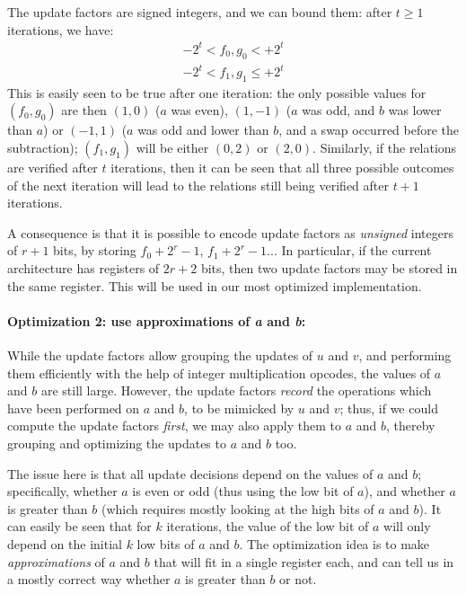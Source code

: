 \documentclass{llncs}
\begin{document}
The update factors are signed integers, and we can bound them: after
$t \geq 1$ iterations, we have:
\begin{equation*}
    \begin{gathered}
    -2^t < f_0, g_0 < +2^t \\
    -2^t < f_1, g_1 \leq +2^t
    \end{gathered}
\end{equation*}
This is easily seen to be true after one iteration: the only possible
values for $(f_0, g_0)$ are then $(1, 0)$ ($a$ was even), $(1, -1)$ ($a$
was odd, and $b$ was lower than $a$) or $(-1, 1)$ ($a$ was odd and lower
than $b$, and a swap occurred before the subtraction); $(f_1, g_1)$ will
be either $(0, 2)$ or $(2, 0)$. Similarly, if the relations are verified
after $t$ iterations, then it can be seen that all three possible
outcomes of the next iteration will lead to the relations still being
verified after $t+1$ iterations.

A consequence is that it is possible to encode update factors as
\emph{unsigned} integers of $r+1$ bits, by storing $f_0 + 2^r - 1$,
$f_1 + 2^r - 1$... In particular, if the current architecture has
registers of $2r+2$ bits, then two update factors may be stored in the
same register. This will be used in our most optimized implementation.

\paragraph{Optimization 2: use approximations of \emph{a} and \emph{b}:}

While the update factors allow grouping the updates of $u$ and $v$, and
performing them efficiently with the help of integer multiplication
opcodes, the values of $a$ and $b$ are still large. However, the update
factors \emph{record} the operations which have been performed on $a$
and $b$, to be mimicked by $u$ and $v$; thus, if we could compute the
update factors \emph{first}, we may also apply them to $a$ and $b$,
thereby grouping and optimizing the updates to $a$ and $b$ too.

The issue here is that all update decisions depend on the values of $a$
and $b$; specifically, whether $a$ is even or odd (thus using the low
bit of $a$), and whether $a$ is greater than $b$ (which requires mostly
looking at the high bits of $a$ and $b$). It can easily be seen that for
$k$ iterations, the value of the low bit of $a$ will only depend on the
initial $k$ low bits of $a$ and $b$. The optimization idea is to make
\emph{approximations} of $a$ and $b$ that will fit in a single register
each, and can tell us in a mostly correct way whether $a$ is greater
than $b$ or not.
\end{document}
